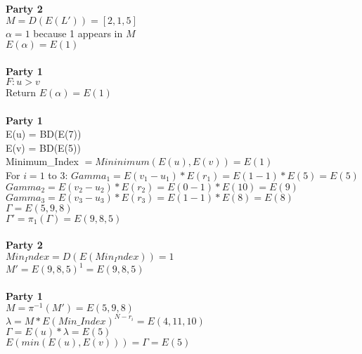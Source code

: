 \documentclass[10pt]{article} %
\begin{document}
\textbf{Party 2} \\
$M = D(E(L')) = [2, 1, 5]$ \\
$\alpha = 1$ because 1 appears in $M$\\
$E(\alpha) = E(1)$ \\ \\
\textbf{Party 1} \\
$F: u > v$ \\
\indent Return $E(\alpha) = E(1)$ \\ \\

\textbf{Party 1} \\
E(u) = BD(E(7)) \\ 
E(v) = BD(E(5)) \\
Minimum\_Index $= Mininimum(E(u), E(v)) = E(1)$ \\
For $i=1$ to 3:
\indent $Gamma_1 = E(v_1 - u_1) * E(r_1) = E(1 - 1) * E(5) = E(5)$ \\
\indent $Gamma_2 = E(v_2 - u_2) * E(r_2) = E(0 - 1) * E(10) = E(9)$ \\
\indent $Gamma_3 = E(v_3 - u_3) * E(r_3) = E(1 - 1) * E(8) = E(8)$ \\
$\Gamma = E(5, 9, 8)$ \\
$\Gamma' = \pi_1(\Gamma) = E(9, 8, 5)$ \\ \\

\textbf{Party 2} \\
\textit{$Min_Index = D(E(Min_Index)) = 1$} \\ 
$M' = E(9, 8, 5)^1 = E(9, 8, 5)$ \\ \\

\textbf{Party 1} \\
$M = \pi^{-1}(M') = E(5, 9, 8)$ \\
$\lambda = M * E(\textit{Min\_Index})^{N - r_i} = E(4, 11, 10)$ \\
$\Gamma = E(u) * \lambda = E(5)$ \\
$E(min(E(u), E(v))) = \Gamma = E(5)$ \\
\end{document}
